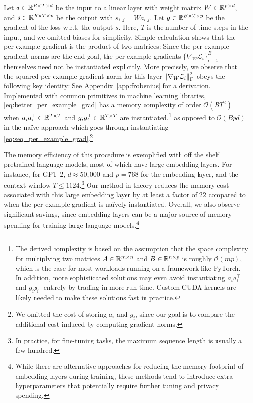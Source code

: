 Let $a \in \mathbb{R}^{B\times T \times d}$ be the input to a linear layer with weight matrix $W \in \mathbb{R}^{p \times d}$, and $s \in \mathbb{R}^{B \times T \times p}$ be the output with $s_{i, j} = W a_{i, j}$. Let $g \in \mathbb{R}^{B \times T \times p}$ be the gradient of the loss w.r.t. the output $s$. 
Here, $T$ is the number of time steps in the input, and we omitted biases for simplicity. 
Simple calculation shows that the per-example gradient is the product of two matrices:
Since the per-example gradient norms are the end goal, the per-example gradients $\{\nabla_W \mathcal{L}_i\}_{i=1}^B$ themselves need not be instantiated explicitly. 
More precisely, we observe that the squared per-example gradient norm for this layer $\left\lVert\nabla_{W} \mathcal{L}_i\right\rVert_{\mathrm{F}}^2$ obeys the following key identity:
See Appendix~\ref{app:frobenius} for a derivation. 
Implemented with common primitives in machine learning libraries, \eqref{eq:better_per_example_grad} has a memory complexity of order $\mathcal{O}(BT^2)$ when $a_{i} a_{i}^\top\in\mathbb{R}^{T\times T}$ and $g_{i} g_{i}^\top\in\mathbb{R}^{T\times T}$ are instantiated,\footnote{The derived complexity is based on the assumption that the space complexity for multiplying two matrices $A\in \mathbb{R}^{m\times n}$ and $B\in \mathbb{R}^{n\times p}$ is roughly $\mathcal{O}(mp)$, which is the case for most workloads running on a framework like PyTorch. 
In addition, more sophisticated solutions may even avoid instantiating $a_{i} a_{i}^\top$ and $g_{i} g_{i}^\top$ entirely by trading in more run-time. Custom CUDA kernels are likely needed to make these solutions fast in practice.
} as opposed to $\mathcal{O}(Bpd)$ in the na\"ive approach which goes through instantiating \eqref{eq:seq_per_example_grad}.\footnote{We omitted the cost of storing $a_i$ and $g_i$, since our goal is to compare the additional cost induced by computing gradient norms.}

The memory efficiency of this procedure is exemplified with off the shelf pretrained language models, most of which have large embedding layers. 
For instance, for GPT-2, $d\approx50,000$ and $p=768$ for the embedding layer, and the context window $T\le 1024$.\footnote{In practice, for fine-tuning tasks, the maximum sequence length is usually a few hundred. } 
Our method in theory reduces the memory cost associated with this large embedding layer by at least a factor of $22$ compared to when the per-example gradient is na\"ively instantiated.
Overall, we also observe significant savings, since embedding layers can be a major source of memory spending for training large language models.\footnote{While there are alternative approaches for reducing the memory footprint of embedding layers during training,  
these methods tend to introduce extra hyperparameters that potentially require further tuning and privacy spending.
}

